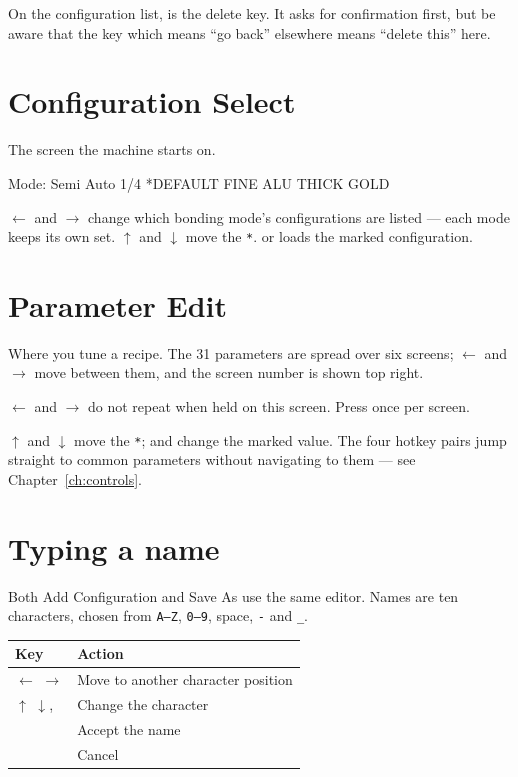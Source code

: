 \begin{wbwarning}
On the configuration list,  is the delete key. It asks for
confirmation first, but be aware that the key which means ``go back'' elsewhere
means ``delete this'' here.
\end{wbwarning}

\section{Configuration Select}

The screen the machine starts on.

\begin{lcdscreen}
\begin{lcdverb}
Mode: Semi Auto  1/4
*DEFAULT
 FINE ALU
 THICK GOLD
\end{lcdverb}
\end{lcdscreen}

$\leftarrow$ and $\rightarrow$ change which bonding mode's configurations are
listed --- each mode keeps its own set. $\uparrow$ and $\downarrow$ move the
\texttt{*}.  or  loads the marked configuration.

\section{Parameter Edit}

Where you tune a recipe. The 31 parameters are spread over six screens;
$\leftarrow$ and $\rightarrow$ move between them, and the screen number is
shown top right.

\begin{wbnote}
$\leftarrow$ and $\rightarrow$ do not repeat when held on this screen. Press
once per screen.
\end{wbnote}

$\uparrow$ and $\downarrow$ move the \texttt{*}; \keycap{$+$} and
\keycap{$-$} change the marked value. The four hotkey pairs jump straight to
common parameters without navigating to them --- see Chapter~\ref{ch:controls}.

\section{Typing a name}

Both Add Configuration and Save As use the same editor. Names are ten
characters, chosen from \texttt{A--Z}, \texttt{0--9}, space, \texttt{-} and
\texttt{\_}.

\begin{center}\small
\begin{tabular}{@{}L{34mm}L{88mm}@{}}
\toprule
\textbf{Key} & \textbf{Action} \\
\midrule
$\leftarrow$ $\rightarrow$ & Move to another character position \\
$\uparrow$ $\downarrow$, \keycap{$+$} \keycap{$-$} & Change the character \\
   & Accept the name \\
 & Cancel \\
\bottomrule
\end{tabular}
\end{center}


